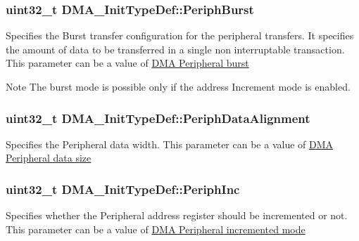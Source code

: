 \subsubsection[{\texorpdfstring{Periph\+Burst}{PeriphBurst}}]{\setlength{\rightskip}{0pt plus 5cm}uint32\+\_\+t D\+M\+A\+\_\+\+Init\+Type\+Def\+::\+Periph\+Burst}\hypertarget{struct_d_m_a___init_type_def_a3fbfe4dd664e24845dc75f5c8f43b5a3}{}\label{struct_d_m_a___init_type_def_a3fbfe4dd664e24845dc75f5c8f43b5a3}
Specifies the Burst transfer configuration for the peripheral transfers. It specifies the amount of data to be transferred in a single non interruptable transaction. This parameter can be a value of \hyperlink{group___d_m_a___peripheral__burst}{D\+MA Peripheral burst} \begin{DoxyNote}{Note}
The burst mode is possible only if the address Increment mode is enabled. 
\end{DoxyNote}
\subsubsection[{\texorpdfstring{Periph\+Data\+Alignment}{PeriphDataAlignment}}]{\setlength{\rightskip}{0pt plus 5cm}uint32\+\_\+t D\+M\+A\+\_\+\+Init\+Type\+Def\+::\+Periph\+Data\+Alignment}\hypertarget{struct_d_m_a___init_type_def_a10a4a549953efa20c235dcbb381b6f0b}{}\label{struct_d_m_a___init_type_def_a10a4a549953efa20c235dcbb381b6f0b}
Specifies the Peripheral data width. This parameter can be a value of \hyperlink{group___d_m_a___peripheral__data__size}{D\+MA Peripheral data size} 
\subsubsection[{\texorpdfstring{Periph\+Inc}{PeriphInc}}]{\setlength{\rightskip}{0pt plus 5cm}uint32\+\_\+t D\+M\+A\+\_\+\+Init\+Type\+Def\+::\+Periph\+Inc}\hypertarget{struct_d_m_a___init_type_def_a46811eb656170cb5c542054d1a41db3a}{}\label{struct_d_m_a___init_type_def_a46811eb656170cb5c542054d1a41db3a}
Specifies whether the Peripheral address register should be incremented or not. This parameter can be a value of \hyperlink{group___d_m_a___peripheral__incremented__mode}{D\+MA Peripheral incremented mode} 
